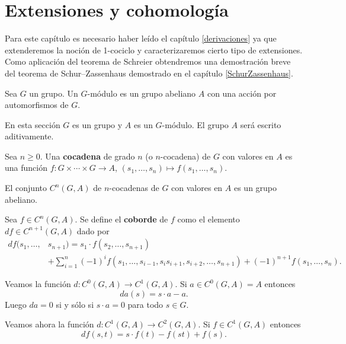 \chapter{Extensiones y cohomología}

Para este capítulo es necesario 
haber leído el capítulo \ref{derivaciones} ya que
extenderemos
la noción de 1-cociclo y caracterizaremos cierto tipo de extensiones. Como aplicación
del teorema de Schreier obtendremos una demostración breve del teorema
de Schur--Zassenhaus demostrado en el capítulo \ref{SchurZassenhaus}. 

\begin{definition}
	Sea $G$ un grupo. Un $G$-módulo es un grupo abeliano $A$ con una acción por
	automorfismos de $G$. 
\end{definition}

En esta sección $G$ es un grupo y $A$ es un $G$-módulo. El grupo $A$ será
escrito aditivamente. 

\begin{definition}
	Sea $n\geq0$. Una \textbf{cocadena}
	de grado $n$ (o $n$-cocadena) de $G$ con valores en $A$ es una función
	$f\colon G\times\cdots\times G\to A$, $(s_1,\dots,s_n)\mapsto
	f(s_1,\dots,s_n)$. 
\end{definition}

	El conjunto $C^n(G,A)$ de $n$-cocadenas de $G$ con valores en
	$A$ es un grupo abeliano. 

\begin{definition}
	Sea $f\in C^n(G,A)$. Se define el \textbf{coborde} de $f$ como el elemento $df\in
	C^{n+1}(G,A)$ dado por 
	\begin{align*}
		df(s_1,\dots,&s_{n+1})=s_1\cdot f(s_2,\dots,s_{n+1})\\
		&+\sum_{i=1}^n (-1)^i f(s_1,\dots,s_{i-1},s_is_{i+1},s_{i+2},\dots,s_{n+1})
		+(-1)^{n+1}f(s_1,\dots,s_n).
	\end{align*}
\end{definition}

\begin{example}
	Veamos la función $d\colon C^0(G,A)\to C^1(G,A)$.  Si $a\in C^0(G,A)=A$
	entonces 
	\[
	da(s)=s\cdot a-a.
	\]
	Luego $da=0$ si y sólo si $s\cdot a=0$ para
	todo $s\in G$.
\end{example}

\begin{example}
	Veamos ahora la función $d\colon C^1(G,A)\to C^2(G,A)$. Si $f\in C^1(G,A)$
	entonces
	\[
	df(s,t)=s\cdot f(t)-f(st)+f(s).
	\]
\end{example}

